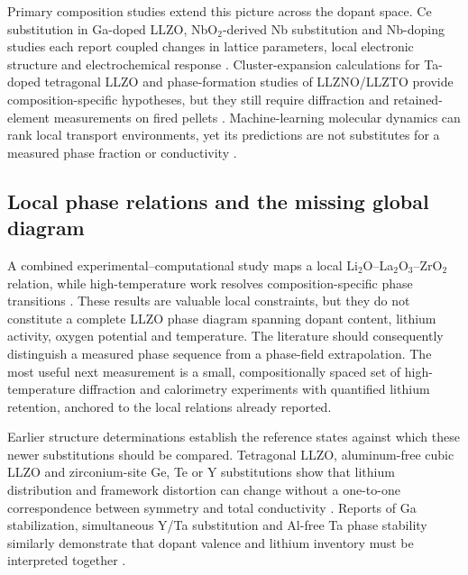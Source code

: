 Primary composition studies extend this picture across the dopant space. Ce substitution in Ga-doped LLZO, NbO$_2$-derived Nb substitution and Nb-doping studies each report coupled changes in lattice parameters, local electronic structure and electrochemical response \cite{aote2025impact,saran2026nbo2,yadzo2025improving}. Cluster-expansion calculations for Ta-doped tetragonal LLZO and phase-formation studies of LLZNO/LLZTO provide composition-specific hypotheses, but they still require diffraction and retained-element measurements on fired pellets \cite{maphoto2023phase,li2025phase,song2026effect}. Machine-learning molecular dynamics can rank local transport environments, yet its predictions are not substitutes for a measured phase fraction or conductivity \cite{kulkarni2025machine,xu2026rational}.

\subsection{Local phase relations and the missing global diagram}

A combined experimental--computational study maps a local Li$_2$O--La$_2$O$_3$--ZrO$_2$ relation, while high-temperature work resolves composition-specific phase transitions \cite{hong2024combined,gullbrekken2025phase}. These results are valuable local constraints, but they do not constitute a complete LLZO phase diagram spanning dopant content, lithium activity, oxygen potential and temperature. The literature should consequently distinguish a measured phase sequence from a phase-field extrapolation. The most useful next measurement is a small, compositionally spaced set of high-temperature diffraction and calorimetry experiments with quantified lithium retention, anchored to the local relations already reported.

Earlier structure determinations establish the reference states against which these newer substitutions should be compared. Tetragonal LLZO, aluminum-free cubic LLZO and zirconium-site Ge, Te or Y substitutions show that lithium distribution and framework distortion can change without a one-to-one correspondence between symmetry and total conductivity \cite{awaka2009synthesis,xie2011lithium,hu2018structure,deviannapoorani2013lithium,murugan2011high}. Reports of Ga stabilization, simultaneous Y/Ta substitution and Al-free Ta phase stability similarly demonstrate that dopant valence and lithium inventory must be interpreted together \cite{wolfenstine2012synthesis,elshinawi2012stabilization,dhivya2014effect,thompson2014tetragonal}.

